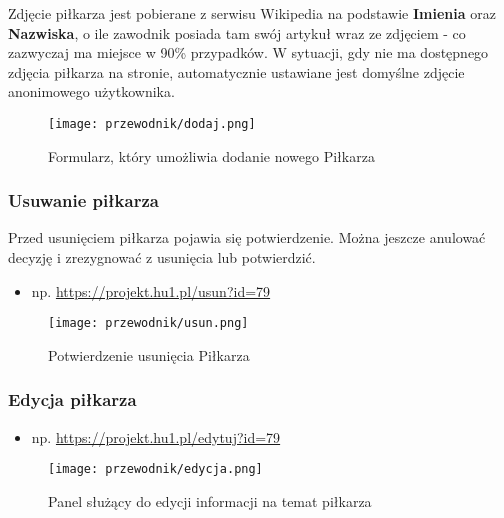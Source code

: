         
                 Zdjęcie piłkarza jest pobierane z serwisu Wikipedia na podstawie \textbf{Imienia} oraz \textbf{Nazwiska}, o ile zawodnik posiada tam swój artykuł wraz ze zdjęciem - co zazwyczaj ma miejsce w 90\% przypadków. W sytuacji, gdy nie ma dostępnego zdjęcia piłkarza na stronie, automatycznie ustawiane jest domyślne zdjęcie anonimowego użytkownika.

                    \begin{figure}[!htb]
                        \centering
                        \texttt{[image: przewodnik/dodaj.png]}
                        \caption{Formularz, który umożliwia dodanie nowego Piłkarza}                
                    \end{figure}
                    \pagebreak

        \subsubsection{Usuwanie piłkarza}
        Przed usunięciem piłkarza pojawia się potwierdzenie. Można jeszcze anulować decyzję i zrezygnować z usunięcia lub potwierdzić.
            \begin{itemize}
                \item np. \url{https://projekt.hu1.pl/usun?id=79}
            \end{itemize}
            
            \begin{figure}[!htb]
                \centering
                \texttt{[image: przewodnik/usun.png]}
                \caption{Potwierdzenie usunięcia Piłkarza}                
            \end{figure}
            \pagebreak

        \subsubsection{Edycja piłkarza}

            \begin{itemize}
                \item np. \url{https://projekt.hu1.pl/edytuj?id=79}
            \end{itemize}
            

            \begin{figure}[!htb]
                \centering
                \texttt{[image: przewodnik/edycja.png]}
                \caption{Panel służący do edycji informacji na temat piłkarza}                
            \end{figure}